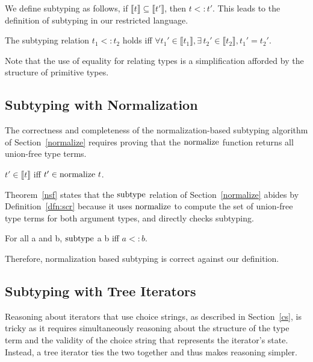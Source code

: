 \documentclass[a4paper,english]{lipics-v2019}
\newcommand{\denotes}[1]{\llbracket #1 \rrbracket}
\renewcommand{\c}[1]{\ensuremath{\text{\lstinline{#1}}}\xspace}
\begin{document}
\noindent
We define subtyping as follows, if $\denotes{t}\subseteq\denotes{t'}$, then
$t<:t'$.  This leads to the definition of subtyping in our restricted language.

\begin{definition}
The subtyping relation $t_1 <: t_2$ holds iff $\forall t_1' \in
\denotes{t_1}, \exists\, t_2' \in \denotes{t_2}, t_1' =
t_2'$.\label{dfn:scr}
\end{definition}

\noindent
Note that the use of equality for relating types is a simplification
afforded by the structure of primitive types.

\subsection{Subtyping with Normalization}

The correctness and completeness of the normalization-based subtyping
algorithm of Section~\ref{normalize} requires proving that the \c{normalize}
function returns all union-free type terms.

\begin{lemma}[NF Equivalence]\label{lem:equiv_ndet}
$t' \in \denotes{t}$ iff $t' \in \c{normalize}~ t$.
\end{lemma}

\noindent
Theorem~\ref{nsf} states that the \c{subtype} relation of
Section~\ref{normalize} abides by Definition~\ref{dfn:scr} because it uses
\c{normalize} to compute the set of union-free type terms for both argument
types, and directly checks subtyping.

\begin{theorem}[NF Subtyping]\label{nsf}
For all  a and b, \c{subtype} a b iff $a <: b$.
\end{theorem}

\noindent
Therefore, normalization based subtyping is correct against our definition.


\subsection{Subtyping with Tree Iterators}

Reasoning about iterators that use choice strings, as described in
Section~\ref{cs}, is tricky as it requires simultaneously reasoning about
the structure of the type term and the validity of the choice string that
represents the iterator's state. Instead, a tree iterator ties the two
together and thus makes reasoning simpler.
\end{document}
